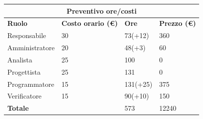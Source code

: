 \documentclass[a4paper, 12pt]{article}
\begin{document}
\begin{center}
	\begin{tabularx}{\textwidth}{|X|X|X|X|}
		\hline
		\multicolumn{4}{|c|}{\textbf{Preventivo ore/costi}}                                      \\
		\hline
		\hline
		\textbf{Ruolo}  & \textbf{Costo orario (\euro)} & \textbf{Ore} & \textbf{Prezzo (\euro)} \\
		\hline
		Responsabile    & 30                            & 73(+12)       & 360                      \\
		\hline
		Amministratore  & 20                            & 48(+3)       & 60                      \\
		\hline
		Analista        & 25                            & 100       	& 0                     \\
		\hline
		Progettista     & 25                            & 131       & 0                     \\
		\hline
		Programmatore   & 15                            & 131(+25)      & 375                    \\
		\hline
		Verificatore    & 15                            & 90(+10)       & 150                      \\
		\hline
		\hline
		\textbf{Totale} &                               & 573          & 12240                    \\
		\hline
	\end{tabularx}\\[8pt]
	\mbox{}\\
\end{center}
\end{document}
